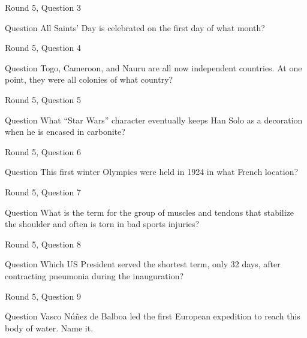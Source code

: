 \documentclass[11pt]{beamer}
\begin{document}
\begin{frame}{Round 5, Question 3}
\begin{block}{Question}
All Saints' Day is celebrated on the first day of what month\@?
\end{block}
\end{frame}
    

\begin{frame}{Round 5, Question 4}
\begin{block}{Question}
Togo, Cameroon, and Nauru are all now independent countries. At one point, they were all colonies of what country\@?
\end{block}
\end{frame}
    

\begin{frame}{Round 5, Question 5}
\begin{block}{Question}
What ``Star Wars'' character eventually keeps Han Solo as a decoration when he is encased in carbonite\@?
\end{block}
\end{frame}
    

\begin{frame}{Round 5, Question 6}
\begin{block}{Question}
This first winter Olympics were held in 1924 in what French location\@?
\end{block}
\end{frame}
    

\begin{frame}{Round 5, Question 7}
\begin{block}{Question}
What is the term for the group of muscles and tendons that stabilize the shoulder and often is torn in bad sports injuries\@?
\end{block}
\end{frame}
    

\begin{frame}{Round 5, Question 8}
\begin{block}{Question}
Which US President served the shortest term, only 32 days, after contracting pneumonia during the inauguration\@?
\end{block}
\end{frame}
    

\begin{frame}{Round 5, Question 9}
\begin{block}{Question}
Vasco Núñez de Balboa led the first European expedition to reach this body of water. Name it.
\end{block}
\end{frame}
    
\end{document}
